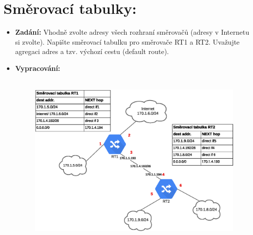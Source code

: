 \documentclass[10pt, a4paper]{article}%
\begin{document}
	\section*{\large{\textbf{Směrovací tabulky:}}}
	\begin{itemize}[label={}]

		\item \textbf{Zadání:}
		Vhodně zvolte adresy všech rozhraní směrovačů (adresy v Internetu si zvolte). Napište směrovací
		tabulku pro směrovače RT1 a RT2. Uvažujte agregaci adres a tzv. výchozí cestu (default route).
		
		\item \textbf{Vypracování:}\\\\
		\begin{figure}[ht!]
			\centering
			\includegraphics[width = 1\textwidth]{tabulky.eps}
		\end{figure}
	\end{itemize}
	
\end{document}
